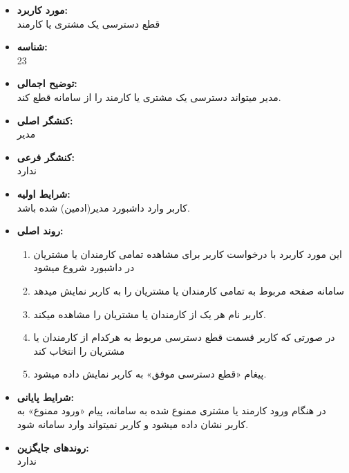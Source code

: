 \documentclass{article}
\begin{document}
\begin{itemize}
\item \textbf{مورد کاربرد:}\\
قطع دسترسی یک مشتری یا کارمند
\item \textbf{شناسه:}\\
23
\item \textbf{توضیح اجمالی:}\\
مدیر میتواند دسترسی یک مشتری یا کارمند را از سامانه قطع کند.
\item \textbf{کنشگر اصلی:}\\
مدیر
\item \textbf{کنشگر فرعی:}\\
ندارد
\item \textbf{شرایط اولیه:}\\
کاربر وارد داشبورد مدیر(ادمین) شده باشد.
\item \textbf{روند اصلی:}\\
\begin{enumerate}
\item  این مورد کاربرد با درخواست کاربر برای مشاهده تمامی کارمندان یا مشتریان در داشبورد شروع میشود
\item سامانه صفحه مربوط به تمامی کارمندان یا مشتریان را به کاربر نمایش میدهد
\item کاربر نام هر یک از کارمندان یا مشتریان را مشاهده میکند.
\item  در صورتی که کاربر قسمت قطع دسترسی مربوط به هرکدام از کارمندان یا مشتریان را انتخاب کند
\item پیغام «قطع دسترسی موفق» به کاربر نمایش داده میشود.
\end{enumerate}
\item \textbf{شرایط پایانی:}\\ 
در هنگام ورود کارمند یا مشتری ممنوع شده به سامانه، پیام «ورود ممنوع» به کاربر نشان داده میشود و کاربر نمیتواند وارد سامانه شود.
\item \textbf{روندهای جایگزین:}\\
ندارد
\end{itemize}
\noindent\makebox[\linewidth]{\rule{\paperwidth}{0.4pt}}
\end{document}

